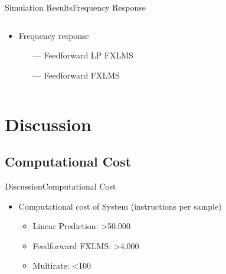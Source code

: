 \begin{frame}{Simulation Results}{Frequency Response}		
\begin{columns}
	\begin{column}{0.4\textwidth}
		\begin{itemize}
			\item Frequency response
			\begin{itemize}
				\item[\textcolor{MATLABorange}{---}] Feedforward LP FXLMS 
				\item[\textcolor{MATLABblue}{---}] Feedforward FXLMS  
			\end{itemize}
		\end{itemize}
	\end{column}
	\begin{column}{0.6\textwidth} 
		\resizebox{0.9\columnwidth}{!}{		
			}
	\end{column}
\end{columns}
\end{frame}


\section{Discussion}
\subsection{Computational Cost}

\begin{frame}{Discussion}{Computational Cost}		
\begin{itemize}
\item Computational cost of System (instructions per sample)
	\begin{itemize}
		\item Linear Prediction: >50.000 
		\item Feedforward FXLMS: >4.000 
		\item Multirate: <100
	\end{itemize}
\end{itemize}

\end{frame}
